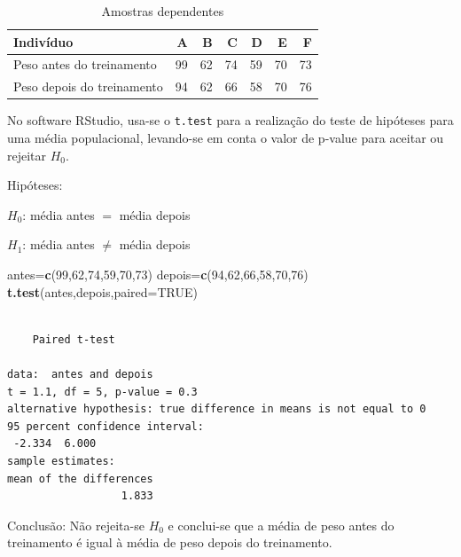 \documentclass[12pt,brazil,oneside]{book}
\newenvironment{Shaded}{\begin{snugshade}}{\end{snugshade}}
\newcommand{\DataTypeTok}[1]{\textcolor[rgb]{0.13,0.29,0.53}{#1}}
\newcommand{\DecValTok}[1]{\textcolor[rgb]{0.00,0.00,0.81}{#1}}
\newcommand{\KeywordTok}[1]{\textcolor[rgb]{0.13,0.29,0.53}{\textbf{#1}}}
\newcommand{\NormalTok}[1]{#1}
\newcommand{\OtherTok}[1]{\textcolor[rgb]{0.56,0.35,0.01}{#1}}
\begin{document}
\begin{table}[t]

\caption{\label{tab:unnamed-chunk-122}Amostras dependentes}
\centering
\begin{tabular}{l|r|r|r|r|r|r}
\hline
Indivíduo & A & B & C & D & E & F\\
\hline
Peso antes do treinamento & 99 & 62 & 74 & 59 & 70 & 73\\
\hline
Peso depois do treinamento & 94 & 62 & 66 & 58 & 70 & 76\\
\hline
\end{tabular}
\end{table}

No software RStudio, usa-se o \texttt{t.test} para a realização do teste de hipóteses para uma média populacional, levando-se em conta o valor de p-value para aceitar ou rejeitar \(H_0\).

Hipóteses:

\textbf{\(H_0\)}: média antes \(=\) média depois

\textbf{\(H_1\)}: média antes \(\neq\) média depois

\begin{Shaded}
\begin{Highlighting}[]
\NormalTok{antes=}\KeywordTok{c}\NormalTok{(}\DecValTok{99}\NormalTok{,}\DecValTok{62}\NormalTok{,}\DecValTok{74}\NormalTok{,}\DecValTok{59}\NormalTok{,}\DecValTok{70}\NormalTok{,}\DecValTok{73}\NormalTok{)}
\NormalTok{depois=}\KeywordTok{c}\NormalTok{(}\DecValTok{94}\NormalTok{,}\DecValTok{62}\NormalTok{,}\DecValTok{66}\NormalTok{,}\DecValTok{58}\NormalTok{,}\DecValTok{70}\NormalTok{,}\DecValTok{76}\NormalTok{)}
\KeywordTok{t.test}\NormalTok{(antes,depois,}\DataTypeTok{paired=}\OtherTok{TRUE}\NormalTok{)}
\end{Highlighting}
\end{Shaded}

\begin{verbatim}

    Paired t-test

data:  antes and depois
t = 1.1, df = 5, p-value = 0.3
alternative hypothesis: true difference in means is not equal to 0
95 percent confidence interval:
 -2.334  6.000
sample estimates:
mean of the differences 
                  1.833 
\end{verbatim}

Conclusão: Não rejeita-se \(H_0\) e conclui-se que a média de peso antes do treinamento é igual à média de peso depois do treinamento.
\end{document}
